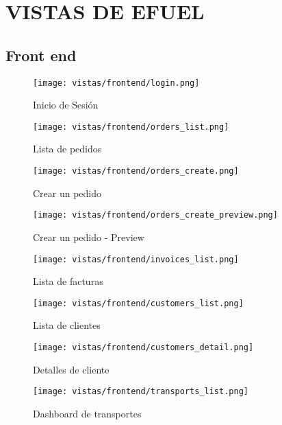 \chapter{VISTAS DE EFUEL} \label{vistas}
\section{Front end}
\begin{figure}[H]
    \texttt{[image: vistas/frontend/login.png]}
    \caption{Inicio de Sesión}
    \label{fig:frontend:login}
    \centering
\end{figure}

\begin{figure}[H]
    \texttt{[image: vistas/frontend/orders\_list.png]}
    \caption{Lista de pedidos}
    \label{fig:frontend:orders_list}
    \centering
\end{figure}

\begin{figure}[H]
    \texttt{[image: vistas/frontend/orders\_create.png]}
    \caption{Crear un pedido}
    \label{fig:frontend:orders_create}
    \centering
\end{figure}

\begin{figure}[H]
    \texttt{[image: vistas/frontend/orders\_create\_preview.png]}
    \caption{Crear un pedido - Preview}
    \label{fig:frontend:orders_create_preview}
    \centering
\end{figure}

\begin{figure}[H]
    \texttt{[image: vistas/frontend/invoices\_list.png]}
    \caption{Lista de facturas}
    \label{fig:frontend:invoices_list}
    \centering
\end{figure}

\begin{figure}[H]
    \texttt{[image: vistas/frontend/customers\_list.png]}
    \caption{Lista de clientes}
    \label{fig:frontend:customers_list}
    \centering
\end{figure}

\begin{figure}[H]
    \texttt{[image: vistas/frontend/customers\_detail.png]}
    \caption{Detalles de cliente}
    \label{fig:frontend:customers_detail}
    \centering
\end{figure}

\begin{figure}[H]
    \texttt{[image: vistas/frontend/transports\_list.png]}
    \caption{Dashboard de transportes}
    \label{fig:frontend:transports_list}
    \centering
\end{figure}

